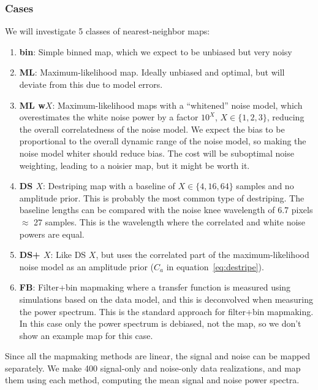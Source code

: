 \documentclass[twocolumn,apj]{aastex63}
\newcommand{\dfn}[1]{\textbf{#1}}
\begin{document}
\subsubsection{Cases}
\label{sec:2d-cases}
We will investigate 5 classes of nearest-neighbor maps:
\begin{enumerate}
	\item \dfn{bin}: Simple binned map, which we expect to be unbiased but very noisy
	\item \dfn{ML}: Maximum-likelihood map. Ideally unbiased and optimal, but will deviate
		from this due to model errors.
	\item \dfn{ML w$X$}: Maximum-likelihood maps with a ``whitened'' noise model,
		which overestimates the
		white noise power by a factor $10^X$, $X\in\{1,2,3\}$, reducing the overall
		correlatedness of the noise model. We expect the bias to be proportional to the
		overall dynamic range of the noise model,
		so making the noise model whiter should reduce bias. The cost will be suboptimal noise
		weighting, leading to a noisier map, but it might be worth it.
	\item \dfn{DS $X$}: Destriping map with a baseline of $X\in \{4,16,64\}$ samples and no amplitude
		prior. This is probably the most common type of destriping. The baseline lengths
		can be compared with the noise knee wavelength of 6.7 pixels $\approx$ 27 samples.
		This is the wavelength where the correlated and white noise powers are equal.
	\item \dfn{DS+ $X$}: Like DS $X$, but uses the correlated part of the maximum-likelihood
		noise model as an amplitude prior ($C_a$ in equation~\ref{eq:destripe}).
	\item \dfn{FB}: Filter+bin mapmaking where a transfer function is measured using
		simulations based on the data model, and this is deconvolved when measuring
		the power spectrum. This is the standard approach for filter+bin mapmaking.
		In this case only the power spectrum is debiased, not the map, so we don't
		show an example map for this case.
\end{enumerate}

Since all the mapmaking methods are linear, the signal and noise can be mapped separately.
We make 400 signal-only and noise-only data realizations, and map them using each method,
computing the mean signal and noise power spectra.
\end{document}
